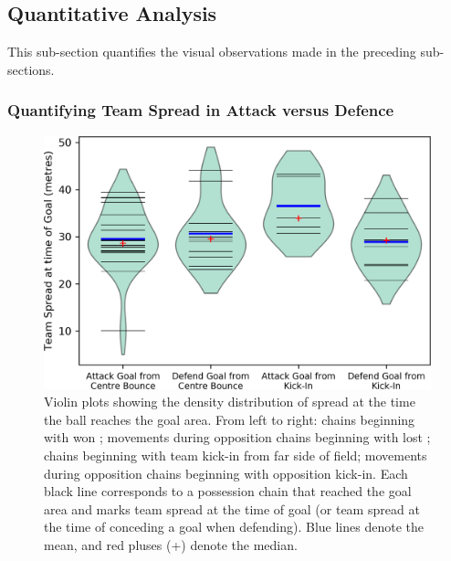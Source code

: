 \subsection{Quantitative Analysis}

This sub-section quantifies the visual observations made in the preceding sub-sections.

\subsubsection{Quantifying Team Spread in Attack versus Defence}

\begin{figure}[!htb]
\centering
\includegraphics[width=0.9\linewidth]{figs/paper/spread-vs-type.png}
\caption{Violin plots showing the density distribution of spread at the time the ball reaches the goal area. From left to right: chains beginning with won \centrebounce{}; movements during opposition chains beginning with lost \centrebounce{}; chains beginning with team kick-in from far side of field; movements during opposition chains beginning with opposition kick-in. Each black line corresponds to a possession chain that reached the goal area and marks team spread at the time of goal (or team spread at the time of conceding a goal when defending). Blue lines denote the mean, and red pluses (+) denote the median.} %
\label{fig:spread-vs-type}
\end{figure}

